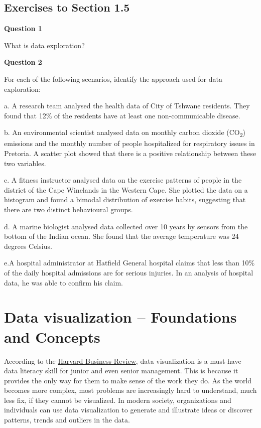 \documentclass[
]{book}
\begin{document}
\subsection{Exercises to Section 1.5}\label{exercises-to-section-1.5}

\textbf{Question 1}

What is data exploration?

\textbf{Question 2}

For each of the following scenarios, identify the approach used for data exploration:

a. A research team analysed the health data of City of Tshwane residents. They found that 12\% of the residents have at least one non-communicable disease.

b. An environmental scientist analysed data on monthly carbon dioxide (CO\textsubscript{2}) emissions and the monthly number of people hospitalized for respiratory issues in Pretoria. A scatter plot showed that there is a positive relationship between these two variables.

c. A fitness instructor analysed data on the exercise patterns of people in the district of the Cape Winelands in the Western Cape. She plotted the data on a histogram and found a bimodal distribution of exercise habits, suggesting that there are two distinct behavioural groups.

d. A marine biologist analysed data collected over 10 years by sensors from the bottom of the Indian ocean. She found that the average temperature was 24 degrees Celsius.

e.A hospital administrator at Hatfield General hospital claims that less than 10\% of the daily hospital admissions are for serious injuries. In an analysis of hospital data, he was able to confirm his claim.

\section{Data visualization -- Foundations and Concepts}\label{sec1-6}

According to the \href{https://hbr.org/2016/06/visualizations-that-really-work}{Harvard Business Review}, data visualization is a must-have data literacy skill for junior and even senior management. This is because it provides the only way for them to make sense of the work they do. As the world becomes more complex, most problems are increasingly hard to understand, much less fix, if they cannot be visualized. In modern society, organizations and individuals can use data visualization to generate and illustrate ideas or discover patterns, trends and outliers in the data.
\end{document}
